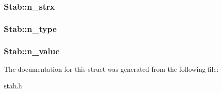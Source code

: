 \subsubsection[{\texorpdfstring{n\+\_\+strx}{n_strx}}]{ Stab\+::n\+\_\+strx}\hypertarget{structStab_a8d874c575cc5137432a0b5fd0b202119}{}\label{structStab_a8d874c575cc5137432a0b5fd0b202119}
\subsubsection[{\texorpdfstring{n\+\_\+type}{n_type}}]{ Stab\+::n\+\_\+type}\hypertarget{structStab_a4952b6befb5edaaa136fd49b7a52ddc8}{}\label{structStab_a4952b6befb5edaaa136fd49b7a52ddc8}
\subsubsection[{\texorpdfstring{n\+\_\+value}{n_value}}]{ Stab\+::n\+\_\+value}\hypertarget{structStab_a934b1b9ccdfb7c332b0513f9d460bed5}{}\label{structStab_a934b1b9ccdfb7c332b0513f9d460bed5}


The documentation for this struct was generated from the following file\+:\begin{DoxyCompactItemize}
\item 
\hyperlink{stab_8h}{stab.\+h}\end{DoxyCompactItemize}

